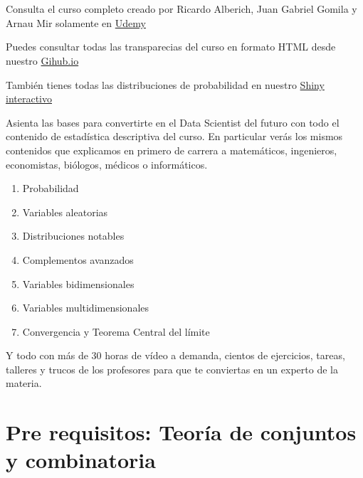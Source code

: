 \documentclass[]{book}
\providecommand{\tightlist}{%
  \setlength{\itemsep}{0pt}\setlength{\parskip}{0pt}}
\begin{document}

{
\setcounter{tocdepth}{1}
\tableofcontents
}
\newcommand{\FunCar}{\phi}
\newcommand{\FunGenMom}{m}
\newcommand{\Momk}{M}
\newcommand{\MomCenk}{MC}
\newcommand\momento{m}
\newcommand{\momentocentral}{\mu}
\newcommand{\Entropia}{H}

\hypertarget{section}{%
\chapter*{}\label{section}}

Consulta el curso completo creado por Ricardo Alberich, Juan Gabriel Gomila y Arnau Mir solamente en \href{https://www.udemy.com/course/probabilidad-y-variables-aleatorias-para-ml-con-r-y-python/?couponCode=B85F8D52148DF5AAD8F7}{Udemy}

Puedes consultar todas las transparecias del curso en formato HTML desde nuestro \href{https://joanby.github.io/bookdown-probabilidad/}{Gihub.io}

También tienes todas las distribuciones de probabilidad en nuestro \href{https://joanby.shinyapps.io/DistribucionesNotables/}{Shiny interactivo}

Asienta las bases para convertirte en el Data Scientist del futuro con todo el contenido de estadística descriptiva del curso. En particular verás los mismos contenidos que explicamos en primero de carrera a matemáticos, ingenieros, economistas, biólogos, médicos o informáticos.

\begin{enumerate}
\def\labelenumi{\arabic{enumi}.}
\tightlist
\item
  Probabilidad
\item
  Variables aleatorias
\item
  Distribuciones notables
\item
  Complementos avanzados
\item
  Variables bidimensionales
\item
  Variables multidimensionales
\item
  Convergencia y Teorema Central del límite
\end{enumerate}

Y todo con más de 30 horas de vídeo a demanda, cientos de ejercicios, tareas, talleres y trucos de los profesores para que te conviertas en un experto de la materia.

\hypertarget{pre-requisitos-teoruxeda-de-conjuntos-y-combinatoria}{%
\chapter*{Pre requisitos: Teoría de conjuntos y combinatoria}\label{pre-requisitos-teoruxeda-de-conjuntos-y-combinatoria}}
\end{document}
